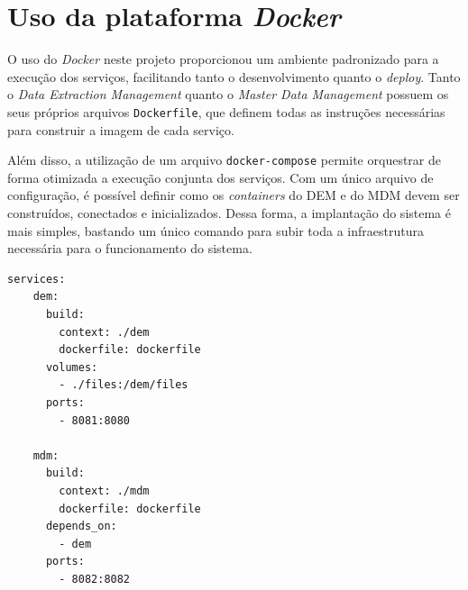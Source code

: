 \documentclass[12pt]{article}
\begin{document}
\section{Uso da plataforma \emph{Docker}}
O uso do \emph{Docker} neste projeto proporcionou um ambiente padronizado para a execução dos serviços, facilitando tanto o desenvolvimento quanto o \emph{deploy}. Tanto o \emph{Data Extraction Management} quanto o \emph{Master Data Management} possuem os seus próprios arquivos \texttt{Dockerfile}, que definem todas as instruções necessárias para construir a imagem de cada serviço.

\quad Além disso, a utilização de um arquivo \texttt{docker-compose} permite orquestrar de forma otimizada a execução conjunta dos serviços. Com um único arquivo de configuração, é possível definir como os \emph{containers} do DEM e do MDM devem ser construídos, conectados e inicializados. Dessa forma, a implantação do sistema é mais simples, bastando um único comando para subir toda a infraestrutura necessária para o funcionamento do sistema.

\begin{lstlisting}[style=vscode]
services:
    dem:
      build:
        context: ./dem
        dockerfile: dockerfile
      volumes:
        - ./files:/dem/files
      ports:
        - 8081:8080
    
    mdm:
      build:
        context: ./mdm
        dockerfile: dockerfile
      depends_on:
        - dem
      ports:
        - 8082:8082
\end{lstlisting}
\end{document}
